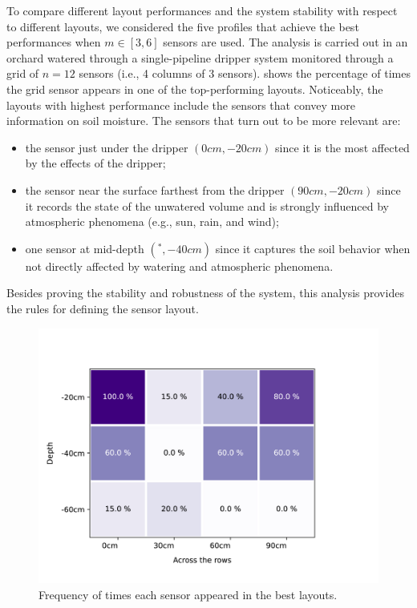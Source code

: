 To compare different layout performances and the system stability with respect to different layouts, we considered the five profiles that achieve the best performances when $m \in [3, 6]$ sensors are used. 
The analysis is carried out in an orchard watered through a single-pipeline dripper system monitored through a grid of $n=12$ sensors (i.e., 4 columns of 3 sensors). 
shows the percentage of times the grid sensor appears in one of the top-performing layouts. 
Noticeably, the layouts with highest performance include the sensors that convey more information on soil moisture.
The sensors that turn out to be more relevant are:
\begin{itemize}
    \item the sensor just under the dripper $(0cm, -20cm)$ since it is the most affected by the effects of the dripper;
    \item the sensor near the surface farthest from the dripper $(90cm, -20cm)$ since it records the state of the unwatered volume and is strongly influenced by atmospheric phenomena (e.g., sun, rain, and wind); 
    \item one sensor at mid-depth $(^*, -40cm)$ since it captures the soil behavior when not directly affected by watering and atmospheric phenomena.
\end{itemize}
Besides proving the stability and robustness of the system, this analysis provides the rules for defining the sensor layout.
\begin{figure}[t]
\centering
\includegraphics[scale=.6]{chapters/physics-aware/pluto/img/heatmap.pdf}
\caption{Frequency of times each sensor appeared in the best layouts.}
\label{pluto-fig:2D_sensors_importance}
\end{figure}

